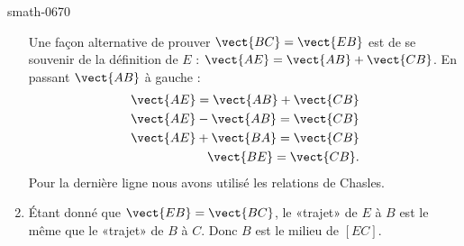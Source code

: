 \begin{corrige}{smath-0670}
\begin{enumerate}
            Une façon alternative de prouver \( \vect{ BC }=\vect{ EB }\) est de se souvenir de la définition de \( E\) : \( \vect{ AE }=\vect{ AB }+\vect{ CB }\). En passant \( \vect{ AB } \) à gauche :
            \begin{subequations}
                \begin{align}
                    \vect{ AE }=\vect{ AB }+\vect{ CB }\\
                    \vect{ AE }-\vect{ AB }=\vect{ CB }\\
                    \vect{ AE }+\vect{ BA }=\vect{ CB }\\
                    \vect{ BE }=\vect{ CB }.
                \end{align}
            \end{subequations}
            Pour la dernière ligne nous avons utilisé les relations de Chasles.
        \item
            Étant donné que \( \vect{ EB }=\vect{ BC }\), le «trajet» de \( E\) à $B$ est le même que le «trajet» de \( B\) à \( C\). Donc \( B\) est le milieu de \( [EC]\).
    \end{enumerate}

\end{corrige}
